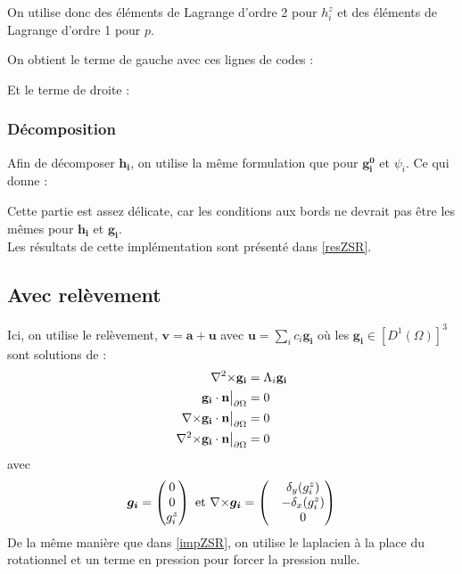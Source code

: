 On utilise donc des éléments de Lagrange d'ordre 2 pour $h_i^z$ et des éléments de Lagrange d'ordre 1 pour $p$.


On obtient le terme de gauche avec ces lignes de codes :


Et le terme de droite :


\subsubsection{Décomposition}

Afin de décomposer $\bm{h_i}$, on utilise la même formulation que pour $\bm{g_i^0}$ et $\psi_i$. Ce qui donne :


Cette partie est assez délicate, car les conditions aux bords ne devrait pas être les mêmes pour $\bm{h_i}$ et $\bm{g_i}$.\\

Les résultats de cette implémentation sont présenté dans \ref{resZSR}.

\subsection{Avec relèvement}
\label{impZAR}

Ici, on utilise le relèvement, $\bm{v}=\bm{a}+\bm{u}$ avec $\bm{u}=\sum_i c_i\bm{g_i}$ où les $\bm{g_i}\in [D^1(\Omega)]^3$ sont solutions de :
\begin{align*}
{\nabla^2\times}  \mathbf{g_i} &= \Lambda_i \mathbf{g_i}\\
\mathbf{g_i}\cdot \mathbf{n}{\big\rvert_{\partial\Omega}} &= 0\\
{\nabla\times} \mathbf{g_i}\cdot \mathbf{n}{\big\rvert_{\partial\Omega}} &= 0\\
{\nabla^2\times}  \mathbf{g_i}\cdot \mathbf{n}{\big\rvert_{\partial\Omega}} &= 0
\end{align*}
avec
\[
\bm{g_i}=
\begin{pmatrix}
0\\
0\\
g_i^z
\end{pmatrix}
\text{ et }
{\nabla\times}\bm{g_i}=
\begin{pmatrix}
&\delta_y(g_i^z)\\
&-\delta_x(g_i^z)\\
&0
\end{pmatrix}
\]
De la même manière que dans \ref{impZSR}, on utilise le laplacien à la place du rotationnel et un terme en pression pour forcer la pression nulle.\\

